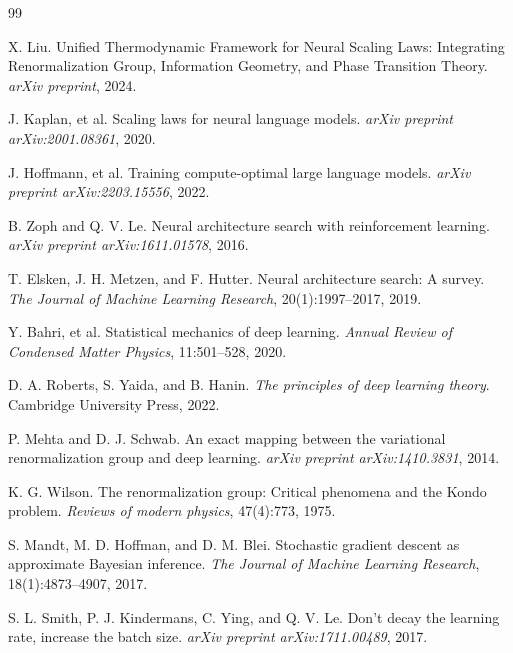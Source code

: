 \documentclass[11pt, a4paper]{article}
\theoremstyle{definition}
\begin{document}
\begin{thebibliography}{99}

X. Liu.
\newblock Unified Thermodynamic Framework for Neural Scaling Laws: Integrating Renormalization Group, Information Geometry, and Phase Transition Theory.
\newblock \emph{arXiv preprint}, 2024.

J. Kaplan, et al. 
\newblock Scaling laws for neural language models. 
\newblock \emph{arXiv preprint arXiv:2001.08361}, 2020.

J. Hoffmann, et al.
\newblock Training compute-optimal large language models. 
\emph{arXiv preprint arXiv:2203.15556}, 2022.

B. Zoph and Q. V. Le.
\newblock Neural architecture search with reinforcement learning. 
\newblock \emph{arXiv preprint arXiv:1611.01578}, 2016.

T. Elsken, J. H. Metzen, and F. Hutter.
\newblock Neural architecture search: A survey. 
\newblock \emph{The Journal of Machine Learning Research}, 20(1):1997--2017, 2019.

Y. Bahri, et al.
\newblock Statistical mechanics of deep learning. 
\newblock \emph{Annual Review of Condensed Matter Physics}, 11:501--528, 2020.

D. A. Roberts, S. Yaida, and B. Hanin.
\newblock \emph{The principles of deep learning theory}. 
\newblock Cambridge University Press, 2022.

P. Mehta and D. J. Schwab.
\newblock An exact mapping between the variational renormalization group and deep learning. 
\newblock \emph{arXiv preprint arXiv:1410.3831}, 2014.

K. G. Wilson.
\newblock The renormalization group: Critical phenomena and the Kondo problem.
\newblock \emph{Reviews of modern physics}, 47(4):773, 1975.

S. Mandt, M. D. Hoffman, and D. M. Blei.
\newblock Stochastic gradient descent as approximate Bayesian inference.
\newblock \emph{The Journal of Machine Learning Research}, 18(1):4873--4907, 2017.

S. L. Smith, P. J. Kindermans, C. Ying, and Q. V. Le.
\newblock Don't decay the learning rate, increase the batch size.
\newblock \emph{arXiv preprint arXiv:1711.00489}, 2017.


\end{thebibliography}
\end{document}

